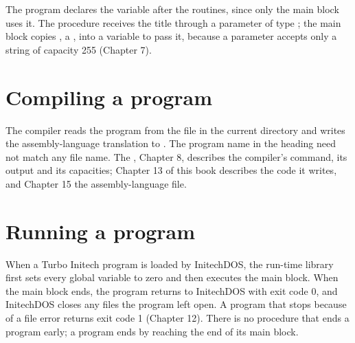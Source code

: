 The program declares the variable  after the routines, since
only the main block uses it.  The procedure  receives the title
through a  parameter of type ; the main block copies
, a , into a  variable to pass it,
because a   parameter accepts only a string of capacity 255
(Chapter 7).

\section{Compiling a program}
The compiler reads the program from the file  in the
current directory and writes the assembly-language translation to
.  The program name in the heading need not match any file
name.  The , Chapter 8, describes the compiler's
command, its output and its capacities; Chapter 13 of this book describes
the code it writes, and Chapter 15 the assembly-language file.

\section{Running a program}
When a Turbo Initech program is loaded by InitechDOS, the run-time library
first sets every global variable to zero and then executes the main block.
When the main block ends, the program returns to InitechDOS with exit code
0, and InitechDOS closes any files the program left open.  A program that
stops because of a file error returns exit code 1 (Chapter 12).  There is
no procedure that ends a program early; a program ends by reaching the end
of its main block.
